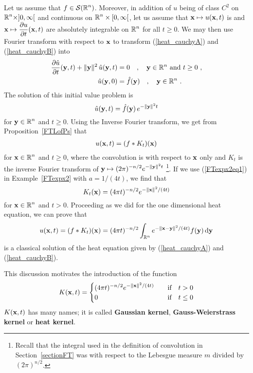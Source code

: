 Let us assume that $\displaystyle f \in \mathcal{S}(\mathbb{R}^n)$.  Moreover, in addition of
$u$ being of class $\displaystyle C^2$ on
$\displaystyle \mathbb{R}^n \times ]0,\infty[$ and
continuous on $\displaystyle \mathbb{R}^n \times [0,\infty[$, let us assume that
$\mathbf{x} \mapsto u(\mathbf{x},t)$ is and
$\displaystyle \mathbf{x} \mapsto \frac{\partial{u}}{\partial t}(\mathbf{x},t)$ are absolutely
integrable on $\displaystyle \mathbb{R}^n$ for all $t \geq 0$.  We may then use Fourier
transform with respect to $\mathbf{x}$ to transform (\ref{heat_cauchyA})
and (\ref{heat_cauchyB}) into
\begin{align*}
\frac{\partial{\hat{u}}}{\partial t}(\mathbf{y},t) + \|\mathbf{y}\|^2\, \hat{u}(\mathbf{y},t)
&= 0 \quad , \quad \mathbf{y} \in \mathbb{R}^n \ \text{and} \ t \geq 0 \ , \\
\hat{u}(\mathbf{y},0) &= \hat{f}(\mathbf{y}) \quad , \quad \mathbf{y} \in \mathbb{R}^n \ .
\end{align*}
The solution of this initial value problem is
\[
\hat{u}(\mathbf{y},t) = \hat{f}(\mathbf{y})\, e ^{-\|\mathbf{y}\|^2 t}
\]
for $\displaystyle \mathbf{y} \in \mathbb{R}^n$ and $t \geq 0$.
Using the Inverse Fourier transform, we get from
Proposition~\ref{FTLofPs} that
\begin{align} \label{heat_sol_cauch1}
u(\mathbf{x},t) = (f \ast K_t)(\mathbf{x})
\end{align}
for $\displaystyle \mathbf{x} \in \mathbb{R}^n$ and $t \geq 0$, 
where the convolution is with respect to $\mathbf{x}$ only and
$K_t$ is the inverse Fourier transform of
$\displaystyle \mathbf{y} \mapsto (2\pi)^{-n/2} e ^{-\|\mathbf{y}\|^2 t}$
\footnote{Recall that the integral used in
the definition of convolution in Section~\ref{sectionFT} was
with respect to the Lebesgue measure $m$ divided by
$(2\pi)^{n/2}$.}.  If we use (\ref{FTexpx2eq1}) in
Example~\ref{FTexpx2} with $a = 1/(4t)$, we find that
\[
K_t(\mathbf{x}) = (4\pi t)^{-n/2} e^{-\|\mathbf{x}\|^2/(4t)}
\]
for $\displaystyle \mathbf{x} \in \mathbb{R}^n$ and $t > 0$.  Proceeding as we
did for the one dimensional heat equation, we can prove that
\[
u(\mathbf{x},t) = (f \ast K_t)(\mathbf{x})
= (4\pi t)^{-n/2} \int_{\mathbb{R}^n} e^{-\|\mathbf{x}-\mathbf{y}\|^2/(4t)}
f(\mathbf{y}) \,\mathrm{d}{\mathbf{y}}
\]
is a classical solution of the heat equation given by (\ref{heat_cauchyA})
and (\ref{heat_cauchyB}).

This discussion motivates the introduction of the function
\[
K(\mathbf{x},t) =
\begin{cases}
\displaystyle (4\pi t)^{-n/2} e^{-\|\mathbf{x}\|^2/(4t)} & \quad 
\text{if} \quad t>0 \\
0 &  \quad \text{if} \quad t\leq 0
\end{cases}
\]
$K(\mathbf{x},t)$ has many names; it is called
{\bfseries Gaussian kernel},
{\bfseries Gauss-Weierstrass kernel}
 or
{\bfseries heat kernel}.

